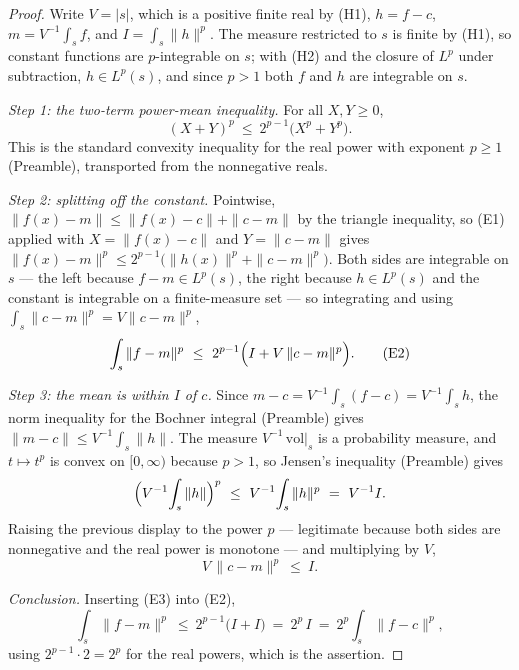 \begin{proof}
Write $V=|s|$, which is a positive finite real by (H1), $h=f-c$,
$m=V^{-1}\!\int_sf$, and $I=\int_s\|h\|^p$.  The measure restricted to $s$ is
finite by (H1), so constant functions are $p$-integrable on $s$; with (H2) and
the closure of $L^p$ under subtraction, $h\in L^p(s)$, and since $p>1$ both $f$
and $h$ are integrable on $s$.

\emph{Step 1: the two-term power-mean inequality.}  For all $X,Y\ge0$,
\[
(X+Y)^p\ \le\ 2^{p-1}\bigl(X^p+Y^p\bigr).
\tag{E1}
\]
This is the standard convexity inequality for the real power with exponent
$p\ge1$ (Preamble), transported from the nonnegative reals.

\emph{Step 2: splitting off the constant.}  Pointwise,
$\|f(x)-m\|\le\|f(x)-c\|+\|c-m\|$ by the triangle inequality, so (E1) applied
with $X=\|f(x)-c\|$ and $Y=\|c-m\|$ gives
$\|f(x)-m\|^p\le2^{p-1}\bigl(\|h(x)\|^p+\|c-m\|^p\bigr)$.  Both sides are
integrable on $s$ --- the left because $f-m\in L^p(s)$, the right because
$h\in L^p(s)$ and the constant is integrable on a finite-measure set --- so
integrating and using $\int_s\|c-m\|^p=V\|c-m\|^p$,
\[
\int_s\|f-m\|^p\ \le\ 2^{p-1}\Bigl(I+V\,\|c-m\|^p\Bigr).
\tag{E2}
\]

\emph{Step 3: the mean is within $I$ of $c$.}  Since
$m-c=V^{-1}\!\int_s(f-c)=V^{-1}\!\int_sh$, the norm inequality for the Bochner
integral (Preamble) gives $\|m-c\|\le V^{-1}\!\int_s\|h\|$.  The measure
$V^{-1}\,\mathrm{vol}|_s$ is a probability measure, and $t\mapsto t^p$ is convex
on $[0,\infty)$ because $p>1$, so Jensen's inequality (Preamble) gives
\[
\Bigl(V^{-1}\!\int_s\|h\|\Bigr)^{p}\ \le\ V^{-1}\!\int_s\|h\|^{p}
\ =\ V^{-1}I .
\]
Raising the previous display to the power $p$ --- legitimate because both sides
are nonnegative and the real power is monotone --- and multiplying by $V$,
\[
V\,\|c-m\|^p\ \le\ I .
\tag{E3}
\]

\emph{Conclusion.}  Inserting (E3) into (E2),
\[
\int_s\|f-m\|^p\ \le\ 2^{p-1}\bigl(I+I\bigr)\ =\ 2^{p}\,I
\ =\ 2^p\int_s\|f-c\|^p ,
\]
using $2^{p-1}\cdot2=2^p$ for the real powers, which is the assertion.
\end{proof}
